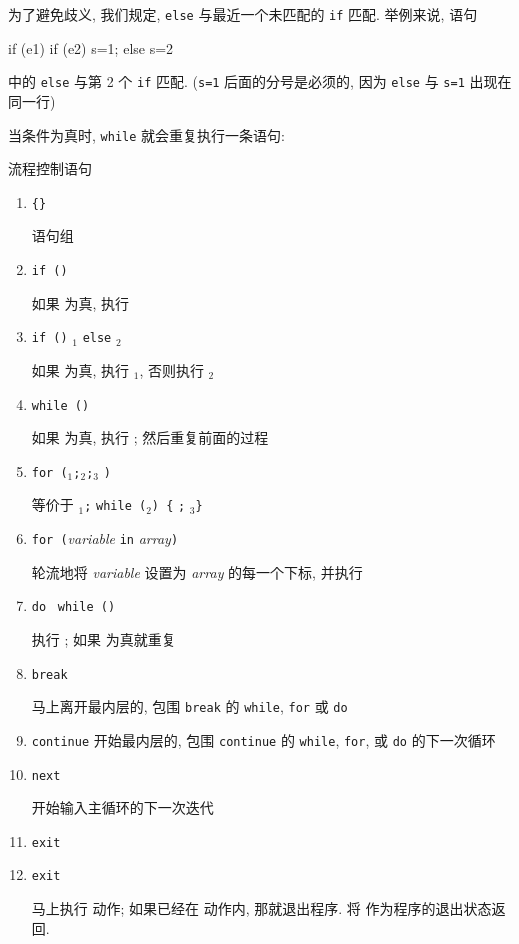为了避免歧义, 我们规定, \verb'else' 与最近一个未匹配的 \verb'if' 匹配.
举例来说, 语句
\begin{awkcode}
    if (e1) if (e2) s=1; else s=2
\end{awkcode}
中的 \verb'else' 与第 2 个 \verb'if' 匹配. (\verb's=1' 后面的分号是必须的,
因为 \verb'else' 与 \verb's=1' 出现在同一行)

当条件为真时, \verb'while' 就会重复执行一条语句:
\begin{summary}{流程控制语句}
    \begin{enumerate}
        \item \verb'{'\stmt\verb'}' \par
            语句组
        \item \verb'if ('\expr\verb')'\stmt \par
            如果 \expr 为真, 执行 \stmt
        \item \verb'if ('\expr\verb')' \stmt$_1$ \verb'else' \stmt$_2$ \par
            如果 \expr 为真, 执行 \stmt$_1$, 否则执行 \stmt$_2$
        \item \verb'while ('\expr\verb')' \stmt \par
            如果 \expr 为真, 执行 \stmt; 然后重复前面的过程
        \item \verb'for ('\expr$_1$\verb';'\expr$_2$\verb';'\expr$_3$
            \verb')' \stmt \par
            等价于 \expr$_1$\verb';' \verb'while ('\expr$_2$\verb') {'
            \stmt\verb';' \expr$_3$\verb'}'
        \item \verb'for ('\textit{variable} \verb'in'
            \textit{array}\verb')' \stmt \par
            轮流地将 \textit{variable} 设置为 \textit{array} 的每一个下标,
            并执行 \stmt
        \item \verb'do' \stmt\ \verb'while ('\expr\verb')' \par
            执行 \stmt; 如果 \expr 为真就重复
        \item \verb'break' \par
            马上离开最内层的, 包围 \verb'break' 的 \verb'while',
            \verb'for' 或 \verb'do'
        \item \verb'continue'
            开始最内层的, 包围 \verb'continue' 的 \verb'while', \verb'for',
            或 \verb'do' 的下一次循环
        \item \verb'next' \par
            开始输入主循环的下一次迭代
        \item \verb'exit'
        \item \verb'exit' \expr \par
            马上执行 \END 动作; 如果已经在 \END 动作内, 那就退出程序.
            将 \expr 作为程序的退出状态返回.
    \end{enumerate}
\end{summary}
